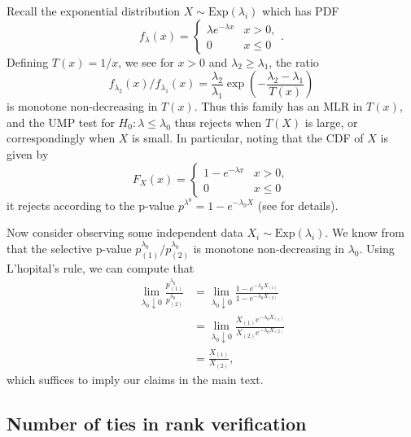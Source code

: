 \documentclass{article}
\begin{document}
\begin{appendix}
Recall the exponential distribution $X \sim \text{Exp}(\lambda_i)$ which has PDF
\begin{equation*}
    f_{\lambda}(x) = 
\begin{cases} 
\lambda e^{-\lambda x} & x > 0, \\ 
0 & x \leq 0 
\end{cases}.
\end{equation*}
Defining $T(x) = 1/x$, we see for $x > 0$ and $\lambda_2 \geq \lambda_1$, the ratio  
\begin{equation*}
   f_{\lambda_2}(x)/f_{\lambda_1}(x) = \frac{\lambda_2}{\lambda_1} \exp\left( - \frac{\lambda_2 - \lambda_1}{T(x)}\right)
\end{equation*}
is monotone non-decreasing in $T(x)$. Thus this family has an MLR in $T(x)$, and the UMP test for $H_0 : \lambda \leq \lambda_0$ thus rejects when $T(X)$ is large, or correspondingly when $X$ is small. In particular, noting that the CDF of $X$ is given by 
\begin{equation*}
F_X(x) = 
\begin{cases} 
1 - e^{-\lambda x} & x > 0, \\ 
0 & x \leq 0 
\end{cases}
\end{equation*}
it rejects according to the p-value $p^{\lambda^0} = 1 - e^{-\lambda_0 X}$ (see  for details).

Now consider observing some independent data $X_i \sim \text{Exp}(\lambda_i)$. We know from  that the selective p-value $p^{\lambda_0}_{(1)}/p^{\lambda_0}_{(2)}$ is monotone non-decreasing in $\lambda_0$. Using L'hopital's rule, we can compute that 
\begin{align*}
    \lim_{\lambda_0 \downarrow 0} \frac{p^{\lambda_0}_{(1)}}{p^{\lambda_0}_{(2)}} &=  \lim_{\lambda_0 \downarrow 0}  \frac{1 - e^{-\lambda_0 X_{(1)}} }{1 - e^{-\lambda_0 X_{(2)}}}\\
    &= \lim_{\lambda_0 \downarrow 0} \frac{X_{(1)}e^{-\lambda_0 X_{(1)}}}{X_{(2)}e^{-\lambda_0 X_{(2)}}}\\
    &= \frac{X_{(1)}}{X_{(2)}},
\end{align*}
which suffices to imply our claims in the main text. 

\subsection{Number of ties in rank verification}
\label{sec:ties_appdx}


\end{appendix}
\end{document}
